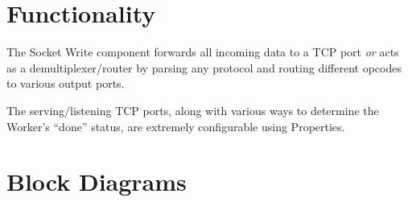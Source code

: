 \section*{Functionality}
\begin{flushleft}
  The Socket Write component forwards all incoming data to a TCP port \textit{or} acts as a demultiplexer/router by parsing any protocol and routing different opcodes to various output ports.\par\medskip
  The serving/listening TCP ports, along with various ways to determine the Worker's ``done'' status, are extremely configurable using Properties.\par\medskip
\end{flushleft}
\begin{center}
\end{center}

\section*{Block Diagrams}
